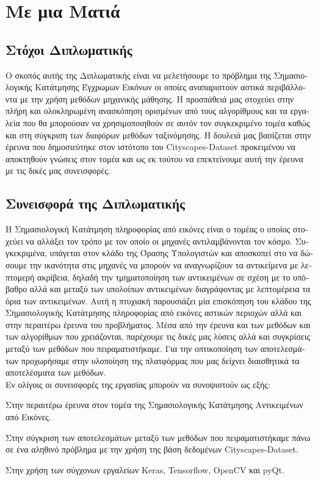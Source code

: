 \section{\textgreek{Με μια Ματιά}}
\subsection{\textgreek{Στόχοι Διπλωματικής}}
\textgreek{Ο σκοπός αυτής της Διπλωματικής είναι να μελετήσουμε το πρόβλημα της Σημασιολογικής Κατάτμησης Έγχρωμων Εικόνων οι οποίες αναπαριστούν αστικά περιβάλλοντα με την χρήση μεθόδων μηχανικής μάθησης. Η προσπάθειά μας στοχεύει στην πλήρη και ολοκληρωμένη ανασκόπηση ορισμένων από τους αλγορίθμους και τα εργαλεία που θα μπορούσαν να χρησιμοποιηθούν σε αυτόν τον συγκεκριμένο τομέα καθώς και στη σύγκριση των διαφόρων μεθόδων ταξινόμησης. Η δουλειά μας βασίζεται στην έρευνα που δημοσιεύτηκε στον ιστότοπο του }Cityscapes-Dataset \textgreek{προκειμένου να αποκτηθούν γνώσεις στον τομέα και ως εκ τούτου να επεκτείνουμε αυτή την έρευνα με τις δικές μας συνεισφορές.}

\subsection{\textgreek{Συνεισφορά της Διπλωματικής}}
\textgreek{Η Σημασιολογική Κατάτμηση πληροφορίας από εικόνες είναι ο τομέας ο οποίος στοχεύει να αλλάξει τον τρόπο με τον οποίο οι μηχανές αντιλαμβάνονται τον κόσμο. Συγκεκριμένα, υπάγεται στον κλάδο της Όρασης Υπολογιστών και αποσκοπεί στο να δώσουμε την ικανότητα στις μηχανές να μπορούν να αναγνωρίζουν τα αντικείμενα με λεπτομερή ακρίβεια, δηλαδή την τμηματοποίηση των αντικειμένων σε σχέση με το υπόβαθρο αλλά και μεταξύ των υπολοίπων αντικειμένων διαγράφοντας με λεπτομέρεια τα όρια των αντικειμένων. Αυτή η πτυχιακή παρουσιάζει μία επισκόπηση του κλάδου της Σημασιολογικής Κατάτμησης πληροφορίας από εικόνες αστικών περιοχών αλλά και στην περαιτέρω έρευνα του προβλήματος. Μέσα από την έρευνα και των μεθόδων και των αλγορίθμων που χρειάζονται, παρέχουμε τις δικές μας λύσεις αλλά και συγκρίσεις μεταξύ των μεθόδων που πειραματιστήκαμε. Για την οπτικοποίηση των αποτελεσμάτων προχωρήσαμε στην υλοποίηση της πλατφόρμας που μας δείχνει διαισθητικά τα αποτελέσματα των μεθόδων.\\

Εν ολίγοις οι συνεισφορές της εργασίας μπορούν να συνοψιστούν ως εξής}:

\begin{description}[labelindent=0.5cm, style=multiline, leftmargin=1cm, font=$\bullet$~]
 \item \textgreek{Στην περαιτέρω έρευνα στον τομέα της Σημασιολογικής Κατάτμησης Αντικειμένων από Εικόνες.}
 \item \textgreek{Στην σύγκριση των αποτελεσμάτων μεταξύ των μεθόδων που πειραματιστήκαμε πάνω σε ένα αληθινό πρόβλημα με την χρήση της βάση δεδομένων} Cityscapes-Dataset.
 \item \textgreek{Στην χρήση των σύγχονων εργαλείων }Keras, Tensorflow, OpenCV \textgreek{και} pyQt.
\end{description}


